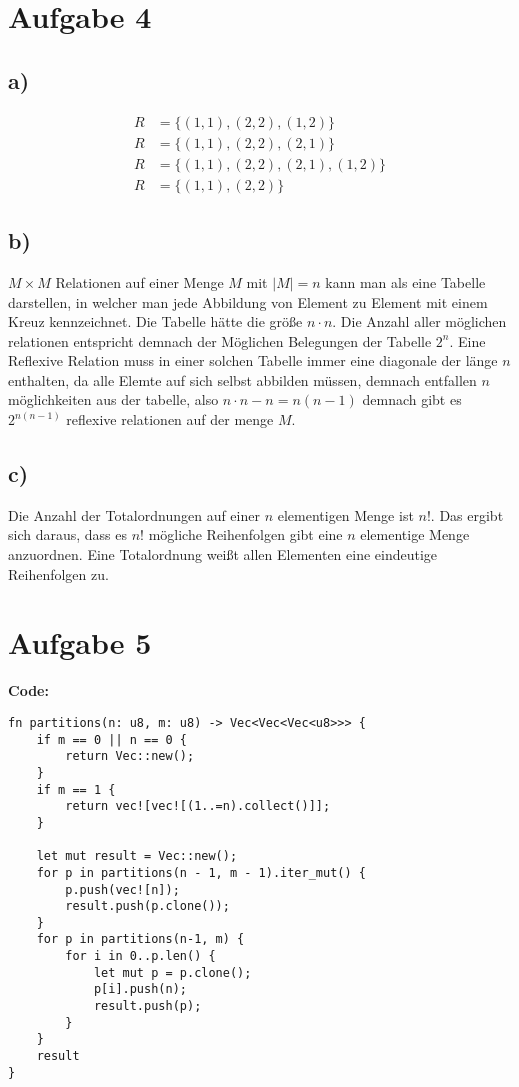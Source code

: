 \documentclass[a4paper]{scrartcl}
\begin{document}
\newpage
\section*{Aufgabe 4}
\subsection*{a)}
\begin{align*}
    R &= \{(1,1),(2,2),(1,2)\} \\
    R &= \{(1,1),(2,2),(2,1)\} \\
    R &= \{(1,1),(2,2),(2,1), (1,2)\} \\
    R &= \{(1,1),(2,2)\}
\end{align*}

\subsection*{b)}
$M \times M$ Relationen auf einer Menge $M$ mit $|M| = n$ kann man als eine Tabelle darstellen, in welcher man jede Abbildung von Element zu Element mit einem Kreuz kennzeichnet. 
Die Tabelle hätte die größe $n \cdot n$. Die Anzahl aller möglichen relationen entspricht demnach der Möglichen Belegungen der Tabelle $2^n$. Eine Reflexive Relation muss in einer solchen Tabelle
immer eine diagonale der länge $n$ enthalten, da alle Elemte auf sich selbst abbilden müssen, demnach entfallen $n$ möglichkeiten aus der tabelle, also $n \cdot n - n = n(n-1)$ demnach gibt es $2^{n(n-1)}$
reflexive relationen auf der menge $M$.

\subsection*{c)}
Die Anzahl der Totalordnungen auf einer $n$ elementigen Menge ist $n!$. Das ergibt sich daraus, dass es $n!$ mögliche 
Reihenfolgen gibt eine $n$ elementige Menge anzuordnen. Eine Totalordnung weißt allen Elementen eine eindeutige Reihenfolgen zu.

\newpage
\section*{Aufgabe 5}

\textbf{Code:}
\begin{lstlisting}
fn partitions(n: u8, m: u8) -> Vec<Vec<Vec<u8>>> {
    if m == 0 || n == 0 {
        return Vec::new();
    }
    if m == 1 {
        return vec![vec![(1..=n).collect()]];
    }

    let mut result = Vec::new();
    for p in partitions(n - 1, m - 1).iter_mut() {
        p.push(vec![n]);
        result.push(p.clone());
    }
    for p in partitions(n-1, m) {
        for i in 0..p.len() {
            let mut p = p.clone();
            p[i].push(n);
            result.push(p);
        }
    }
    result
}
\end{lstlisting}
\end{document}
